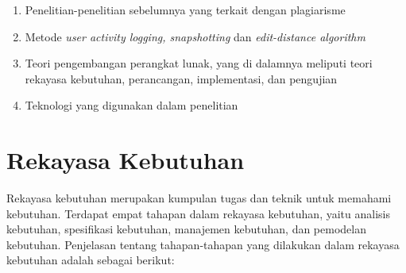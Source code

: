 \begin{enumerate}
\item Penelitian-penelitian sebelumnya yang terkait dengan plagiarisme
\item Metode \emph{user activity logging, snapshotting} dan \emph{edit-distance algorithm}
\item Teori pengembangan perangkat lunak, yang di dalamnya meliputi
  teori rekayasa kebutuhan, perancangan, implementasi, dan pengujian
\item Teknologi yang digunakan dalam penelitian
\end{enumerate}

\section{Rekayasa Kebutuhan}

Rekayasa kebutuhan merupakan kumpulan tugas dan teknik untuk memahami
kebutuhan. Terdapat empat tahapan dalam rekayasa kebutuhan, yaitu
analisis kebutuhan, spesifikasi kebutuhan, manajemen kebutuhan, dan
pemodelan kebutuhan. Penjelasan tentang tahapan-tahapan yang dilakukan
dalam rekayasa kebutuhan adalah sebagai berikut:

